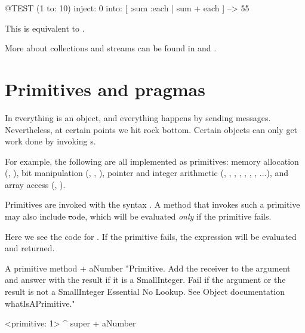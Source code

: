 \documentclass[a4paper,10pt,twoside]{book}
\begin{document}
\begin{code}{@TEST}
(1 to: 10) inject: 0 into: [ :sum :each | sum + each ] --> 55
\end{code}

\noindent
This is equivalent to .

More about collections and streams can be found in   and .

\section{Primitives and pragmas}

In \st everything is an object, and everything happens by sending messages.
Nevertheless, at certain points we hit rock bottom.
Certain objects can only get work done by invoking  s.

For example, the following are all implemented as primitives:
memory allocation (, ),
bit manipulation (, , ),
pointer and integer arithmetic (\ct{+}, \ct{-},  \ct{<},  \ct{>}, \ct{*}, \ct{/ }, \ct{=}, \ct{==}...),
and array access (, ).

Primitives are invoked with the syntax .
A method that invokes such a primitive may also include \st code, which will be evaluated \emph{only} if the primitive fails.

Here we see the code for .
If the primitive fails, the expression  will be evaluated and returned.

\begin{method}[primitive]{A primitive method}
+ aNumber 
  "Primitive. Add the receiver to the argument and answer with the result
  if it is a SmallInteger. Fail if the argument or the result is not a
  SmallInteger  Essential  No Lookup. See Object documentation whatIsAPrimitive."

  <primitive: 1>
  ^ super + aNumber
\end{method}

\end{document}
